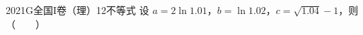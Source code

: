 
\begin{problem}{2021}{G}{全国I卷（理）}{12}{不等式}
设 $ a=2\ln 1.01 $，$ b=\ln 1.02 $，$ c=\sqrt{1.04}-1 $，则 \hspace{1cm}（　　）
\begin{choices}
\end{choices}
\end{problem}

\begin{answer}

\end{answer}

\begin{solutions}

\end{solutions}